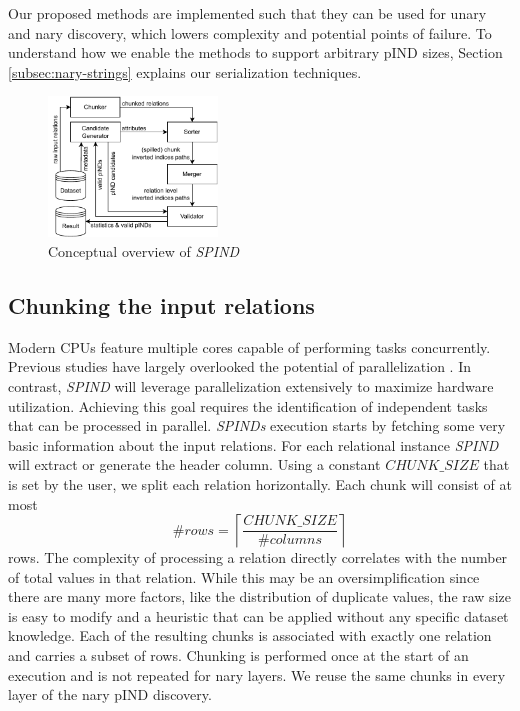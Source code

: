 Our proposed methods are implemented such that they can be used for unary and nary discovery, which lowers complexity and potential points of failure. To understand how we enable the methods to support arbitrary pIND sizes, Section \ref{subsec:nary-strings} explains our serialization techniques.

\begin{figure}[t]
    \centering
    \includegraphics[width=0.4\textwidth]{figures/SPIND.pdf}
    \caption{Conceptual overview of \textit{SPIND}}
    \label{fig:spind}
\end{figure}

\subsection{Chunking the input relations}\label{subsec:chunking}
Modern CPUs feature multiple cores capable of performing tasks concurrently. Previous studies have largely overlooked the potential of parallelization \cite{smirnov2023fast, papenbrock2015divide, bauckmann2006efficiently, bell1995discovery}. In contrast, \textit{SPIND} will leverage parallelization extensively to maximize hardware utilization. Achieving this goal requires the identification of independent tasks that can be processed in parallel. \textit{SPINDs} execution starts by fetching some very basic information about the input relations. For each relational instance \textit{SPIND} will extract or generate the header column. Using a constant $CHUNK\_SIZE$ that is set by the user, we split each relation horizontally. Each chunk will consist of at most 
$$\#\textit{rows} = \left \lceil \frac{CHUNK\_SIZE}{\#\textit{columns}} \right \rceil$$
rows. The complexity of processing a relation directly correlates with the number of total values in that relation. While this may be an oversimplification since there are many more factors, like the distribution of duplicate values, the raw size is easy to modify and a heuristic that can be applied without any specific dataset knowledge. Each of the resulting chunks is associated with exactly one relation and carries a subset of rows. Chunking is performed once at the start of an execution and is not repeated for nary layers. We reuse the same chunks in every layer of the nary pIND discovery.

